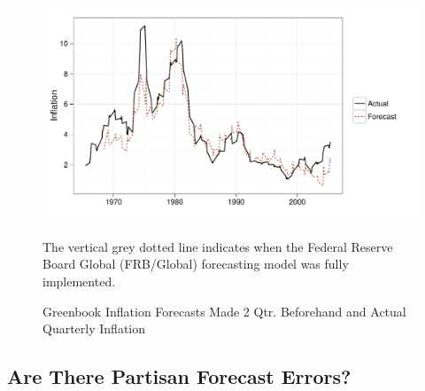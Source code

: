 \documentclass[a4paper]{article}
\begin{document}
\begin{figure}[t]
    \caption{Greenbook Inflation Forecasts Made 2 Qtr. Beforehand and Actual Quarterly Inflation}
    \label{absolute}
    \begin{center}

\begin{knitrout}
\color{fgcolor}

{\centering \includegraphics[width=0.8\linewidth]{figure/BaseInflation} 

}



\end{knitrout}


    \end{center}
    \begin{singlespace}
        {\scriptsize{The vertical grey dotted line indicates when the Federal Reserve Board Global (FRB/Global) forecasting model was fully implemented.
                      }}
    \end{singlespace}
\end{figure}


\subsection{Are There Partisan Forecast Errors?}
\end{document}
